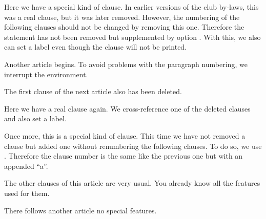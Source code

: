%
Here we have a special kind of clause. In earlier versions of the club by-laws,
this was a real clause, but it was later removed. However, the
numbering of the following clauses should not be changed by removing this
one. Therefore the  statement has not been
removed but supplemented by option . With this, we also can set
a label even though the clause will not be printed.

%
Another article begins. To avoid problems with the paragraph numbering, we
interrupt the  environment.

%
The first clause of the next article also has been deleted.

%
Here we have a real clause again. We cross-reference one of the deleted
clauses and also set a label.

%
Once more, this is a special kind of clause. This time we have not removed a
clause but added one without renumbering the following clauses. To do so,
we use . Therefore the clause number is the
same like the previous one but with an appended ``a''.

%
The other clauses of this article are very usual. You already know all the
features used for them.

%
There follows another article no special features.

